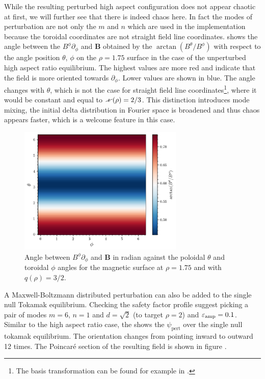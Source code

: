 While the resulting perturbed high aspect configuration does not appear chaotic at first, we will further see that there is indeed chaos here. In fact the modes of perturbation are not only the $m$ and $n$ which are used in the implementation because the toroidal coordinates are not straight field line coordinates.  shows the angle between the $B^\phi\partial_\phi$ and $\textbf{B}$ obtained by the $\arctan(B^\theta/B^\phi)$ with respect to the angle position $\theta$, $\phi$ on the $\rho = 1.75$ surface in the case of the unperturbed high aspect ratio equilibrium. The highest values are more red and indicate that the field is more oriented towards $\partial_\phi$. Lower values are shown in blue. The angle changes with $\theta$, which is not the case for straight field line coordinates\footnote{The basis transformation can be found for example in \cite[p.116]{dhaeseleer_flux_1991}.}, where it would be constant and equal to $\iotaslash(\rho) = 2/3$. This distinction introduces mode mixing, the initial delta distribution in Fourier space is broadened and thus chaos appears faster, which is a welcome feature in this case.

\begin{figure}[H]
    \centering
    \includegraphics[width=0.7\textwidth]{images/high-aspect-ratio/fieldlines.png}
    \caption{Angle between $B^\phi\partial_\phi$ and $\textbf{B}$ in radian against the poloidal $\theta$ and toroidal $\phi$ angles for the magnetic surface at $\rho = 1.75$ and with $q(\rho) = 3/2$.}
    \label{fig:mode-mixing}
\end{figure}

A Maxwell-Boltzmann distributed perturbation can also be added to the single null Tokamak equilibrium. Checking the safety factor profile  suggest picking a pair of modes $m=6$, $n=1$ and $d = \sqrt{2}$ (to target $\rho = 2$) and $\varepsilon_\text{amp} = 0.1$. Similar to the high aspect ratio case, the  shows the $\psi_\text{pert}$ over the single null tokamak equilibrium. The orientation changes from pointing inward to outward 12 times. The Poincaré section of the resulting field is shown in figure .


